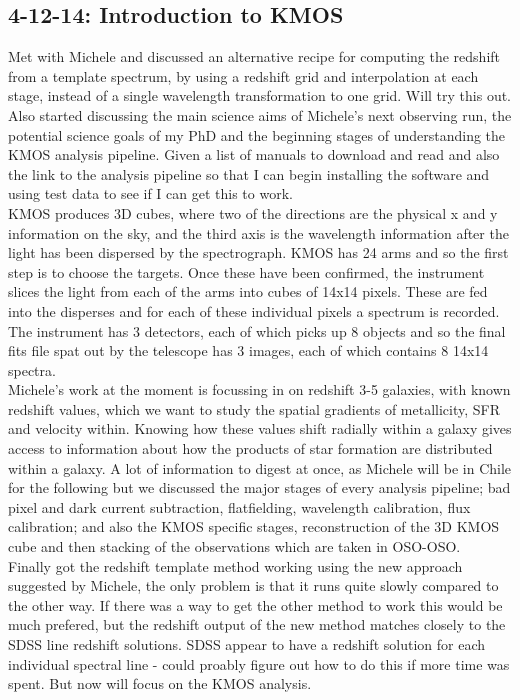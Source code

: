 \documentclass{literature}
\begin{document}
\subsection{4-12-14: Introduction to KMOS}
Met with Michele and discussed an alternative recipe for computing the redshift from a template spectrum, by using a redshift grid and interpolation at each stage, instead of a single wavelength transformation to one grid. Will try this out. Also started discussing the main science aims of Michele's next observing run, the potential science goals of my PhD and the beginning stages of understanding the KMOS analysis pipeline. Given a list of manuals to download and read and also the link to the analysis pipeline so that I can begin installing the software and using test data to see if I can get this to work. \\
KMOS produces 3D cubes, where two of the directions are the physical x and y information on the sky, and the third axis is the wavelength information after the light has been dispersed by the spectrograph. KMOS has 24 arms and so the first step is to choose the targets. Once these have been confirmed, the instrument slices the light from each of the arms into cubes of 14x14 pixels. These are fed into the disperses and for each of these individual pixels a spectrum is recorded. The instrument has 3 detectors, each of which picks up 8 objects and so the final fits file spat out by the telescope has 3 images, each of which contains 8 14x14 spectra. \\ 
Michele's work at the moment is focussing in on redshift 3-5 galaxies, with known redshift values, which we want to study the spatial gradients of metallicity, SFR and velocity within. Knowing how these values shift radially within a galaxy gives access to information about how the products of star formation are distributed within a galaxy. A lot of information to digest at once, as Michele will be in Chile for the following but we discussed the major stages of every analysis pipeline; bad pixel and dark current subtraction, flatfielding, wavelength calibration, flux calibration; and also the KMOS specific stages, reconstruction of the 3D KMOS cube and then stacking of the observations which are taken in OSO-OSO.  \\
Finally got the redshift template method working using the new approach suggested by Michele, the only problem is that it runs quite slowly compared to the other way. If there was a way to get the other method to work this would be much prefered, but the redshift output of the new method matches closely to the SDSS line redshift solutions. SDSS appear to have a redshift solution for each individual spectral line - could proably figure out how to do this if more time was spent. But now will focus on the KMOS analysis. 
\end{document}
